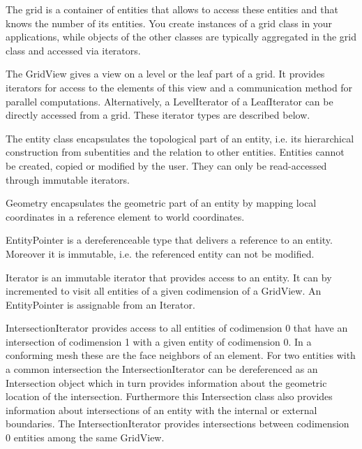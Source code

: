 \documentclass[11pt,a4paper,headinclude,footinclude,DIV16,normalheadings]{scrreprt}
\begin{document}
    The grid 
    is a container of entities that allows to access these entities
    and that knows the number of its entities. You create instances of
    a grid class in your applications, while objects of the other
    classes are typically aggregated in the grid class and accessed via
    iterators. 


    The GridView gives a view on a level or the leaf part of a grid. It
    provides iterators for access to the elements of this view and a
    communication method for parallel computations. Alternatively, a
    LevelIterator of a LeafIterator  can be directly accessed from a grid.
    These iterator types are described below.


    The entity class encapsulates
    the topological part of an entity, i.e. its hierarchical
    construction from subentities and the relation to other
    entities. Entities cannot be created, copied or modified by the
    user. They can only be read-accessed through immutable iterators. 


    Geometry
    encapsulates the geometric part of an entity by mapping local
    coordinates in a reference element to world coordinates. 


    EntityPointer  is a
    dereferenceable type that delivers a reference to an
    entity. Moreover it is immutable, i.e. the referenced entity can
    not be modified. 


    Iterator is an
    immutable iterator that provides access to an entity. It can by
    incremented to visit all entities of a given
    codimension of a GridView. An EntityPointer is assignable
    from an Iterator. 


    IntersectionIterator provides access to all entities of
    codimension 0 that have an intersection of codimension 1 with a
    given entity of codimension 0. In a conforming mesh these are the
    face neighbors of an element. For two entities with a common
    intersection the IntersectionIterator can be dereferenced as an Intersection
    object which in turn provides information about the geometric location of
    the intersection.  Furthermore this Intersection class also provides
    information about intersections of an entity
    with
    the internal or external boundaries. 
    The IntersectionIterator provides intersections between
    codimension 0 entities among the same GridView.
    
\end{document}
